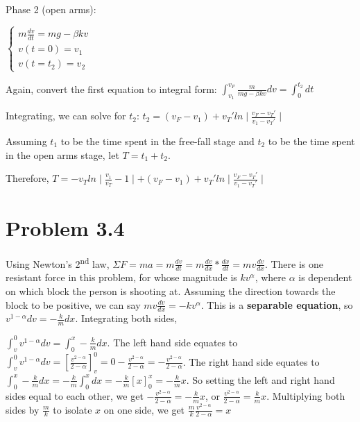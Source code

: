 \documentclass{article}
\begin{document}
\noindent Phase 2 (open arms): \par\vspace{0.25cm}

\noindent $\begin{cases}
    m\frac{dv}{dt} = mg - \beta kv \\
    v(t = 0) = v_{1} \\
    v(t = t_{2}) = v_{2}
    \end{cases}$
    
\par\vspace{0.25cm}

\noindent Again, convert the first equation to integral form: $\int_{v_{1}}^{v_{F}} \frac{m}{mg - \beta kv} dv = \int_{0}^{t_{2}} dt$ \par
\noindent Integrating, we can solve for $t_{2}$: $t_{2} = (v_{F} - v_{1}) + v_{T}' ln \mid \frac{v_{F} - v_{T}'}{v_{1} - v_{T}'} \mid$ \par
\noindent Assuming $t_{1}$ to be the time spent in the free-fall stage and $t_{2}$ to be the time spent in the open arms stage, let $T = t_{1} + t_{2}$. \par
\noindent Therefore, $T = -v_{T} ln \mid \frac{v_{1}}{v_{T}} - 1 \mid + (v_{F} - v_{1}) + v_{T}' ln \mid \frac{v_{F} - v_{T}'}{v_{1} - v_{T}'} \mid$
\section{Problem 3.4}

Using Newton's 2\textsuperscript{nd} law, $\Sigma F = ma = m\frac{dv}{dt} = m\frac{dv}{dx} * \frac{dx}{dt} = mv\frac{dv}{dx}$.  There is one resistant force in this problem, for whose magnitude is $kv^{\alpha}$, where $\alpha$ is dependent on which block the person is shooting at.  Assuming the direction towards the block to be positive, we can say $mv\frac{dv}{dx} = -kv^{\alpha}$.  This is a \textbf{separable equation}, so $v^{1 - \alpha} dv = -\frac{k}{m}dx$.  Integrating both sides, \par \noindent $\int_{v}^{0} v^{1 - \alpha}dv = \int_{0}^{x} -\frac{k}{m}dx$.  The left hand side equates to $\int_{v}^{0} v^{1 - \alpha}dv = [\frac{v^{2 - \alpha}}{2 - \alpha}]_{v}^{0} = 0 - \frac{v^{2 - \alpha}}{2 - \alpha} = -\frac{v^{2 - \alpha}}{2 - \alpha}$.  The right hand side equates to $\int_{0}^{x} -\frac{k}{m}dx = -\frac{k}{m} \int_{0}^{x}dx = -\frac{k}{m}[x]_{0}^{x} = -\frac{k}{m}x$.  So setting the left and right hand sides equal to each other, we get $-\frac{v^{2 - \alpha}}{2 - \alpha} = -\frac{k}{m}x$, or $\frac{v^{2 - \alpha}}{2 - \alpha} = \frac{k}{m}x$.  Multiplying both sides by $\frac{m}{k}$ to isolate $x$ on one side, we get $\frac{m}{k} \frac{v^{2 - \alpha}}{2 - \alpha} = x$ \par\vspace{0.25cm}
\end{document}

